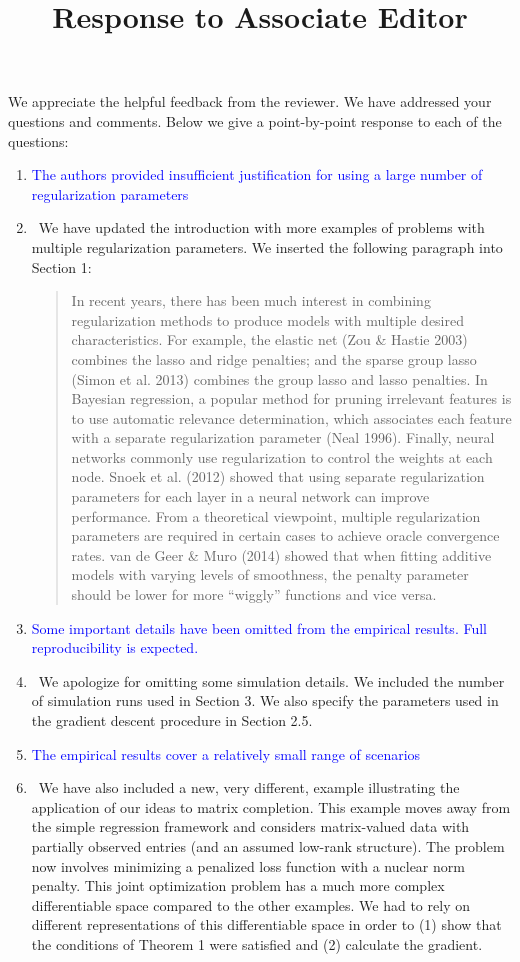 \documentclass[]{article}
\title{Response to Associate Editor}
\newcommand{\point}[1]{\item \textcolor{blue}{#1}}
\newcommand{\reply}{\item[]\ }
\begin{document}
	\maketitle
		
	We appreciate the helpful feedback from the reviewer. We have addressed your questions and comments. Below we give a point-by-point response to each of the questions:
		
	\begin{enumerate}
		\point{The authors provided insufficient justification for using a large number of regularization parameters}

		\reply  We have updated the introduction with more examples of problems with multiple regularization parameters. We inserted the following paragraph into Section 1:
		
		\begin{quote}
			In recent years, there has been much interest in combining regularization methods to produce models with multiple desired characteristics. For example, the elastic net (Zou \& Hastie 2003) combines the lasso and ridge penalties; and the sparse group lasso (Simon et al. 2013) combines the group lasso and lasso penalties. In Bayesian regression, a popular method for pruning irrelevant features is to use automatic relevance determination, which associates each feature with a separate regularization parameter (Neal 1996). Finally, neural networks commonly use regularization to control the weights at each node. Snoek et al. (2012) showed that using separate regularization parameters for each layer in a neural network can improve performance. From a theoretical viewpoint, multiple regularization parameters are required in certain cases to achieve oracle convergence rates. van de Geer \& Muro (2014) showed that when fitting additive models with varying levels of smoothness, the penalty parameter should be lower for more ``wiggly'' functions and vice versa. 
		\end{quote}
		
		\point{Some important details have been omitted from the empirical results. Full reproducibility is expected.}
		
		\reply We apologize for omitting some simulation details. We included the number of simulation runs used in Section 3. We also specify the parameters used in the gradient descent procedure in Section 2.5.
		
		\point{The empirical results cover a relatively small range of scenarios}
		
		\reply We have also included a new, very different, example illustrating the application of our ideas to matrix completion. This example moves away from the simple regression framework and considers matrix-valued data with partially observed entries (and an assumed low-rank structure). The problem now involves minimizing a penalized loss function with a nuclear norm penalty. This joint optimization problem has a much more complex differentiable space compared to the other examples. We had to rely on different representations of this differentiable space in order to (1) show that the conditions of Theorem 1 were satisfied and (2) calculate the gradient. 
		

\end{enumerate}
\end{document}
